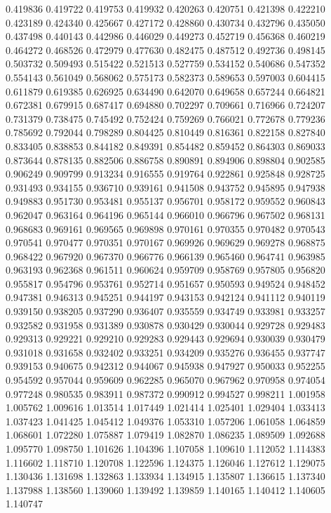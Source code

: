 0.419836
0.419722
0.419753
0.419932
0.420263
0.420751
0.421398
0.422210
0.423189
0.424340
0.425667
0.427172
0.428860
0.430734
0.432796
0.435050
0.437498
0.440143
0.442986
0.446029
0.449273
0.452719
0.456368
0.460219
0.464272
0.468526
0.472979
0.477630
0.482475
0.487512
0.492736
0.498145
0.503732
0.509493
0.515422
0.521513
0.527759
0.534152
0.540686
0.547352
0.554143
0.561049
0.568062
0.575173
0.582373
0.589653
0.597003
0.604415
0.611879
0.619385
0.626925
0.634490
0.642070
0.649658
0.657244
0.664821
0.672381
0.679915
0.687417
0.694880
0.702297
0.709661
0.716966
0.724207
0.731379
0.738475
0.745492
0.752424
0.759269
0.766021
0.772678
0.779236
0.785692
0.792044
0.798289
0.804425
0.810449
0.816361
0.822158
0.827840
0.833405
0.838853
0.844182
0.849391
0.854482
0.859452
0.864303
0.869033
0.873644
0.878135
0.882506
0.886758
0.890891
0.894906
0.898804
0.902585
0.906249
0.909799
0.913234
0.916555
0.919764
0.922861
0.925848
0.928725
0.931493
0.934155
0.936710
0.939161
0.941508
0.943752
0.945895
0.947938
0.949883
0.951730
0.953481
0.955137
0.956701
0.958172
0.959552
0.960843
0.962047
0.963164
0.964196
0.965144
0.966010
0.966796
0.967502
0.968131
0.968683
0.969161
0.969565
0.969898
0.970161
0.970355
0.970482
0.970543
0.970541
0.970477
0.970351
0.970167
0.969926
0.969629
0.969278
0.968875
0.968422
0.967920
0.967370
0.966776
0.966139
0.965460
0.964741
0.963985
0.963193
0.962368
0.961511
0.960624
0.959709
0.958769
0.957805
0.956820
0.955817
0.954796
0.953761
0.952714
0.951657
0.950593
0.949524
0.948452
0.947381
0.946313
0.945251
0.944197
0.943153
0.942124
0.941112
0.940119
0.939150
0.938205
0.937290
0.936407
0.935559
0.934749
0.933981
0.933257
0.932582
0.931958
0.931389
0.930878
0.930429
0.930044
0.929728
0.929483
0.929313
0.929221
0.929210
0.929283
0.929443
0.929694
0.930039
0.930479
0.931018
0.931658
0.932402
0.933251
0.934209
0.935276
0.936455
0.937747
0.939153
0.940675
0.942312
0.944067
0.945938
0.947927
0.950033
0.952255
0.954592
0.957044
0.959609
0.962285
0.965070
0.967962
0.970958
0.974054
0.977248
0.980535
0.983911
0.987372
0.990912
0.994527
0.998211
1.001958
1.005762
1.009616
1.013514
1.017449
1.021414
1.025401
1.029404
1.033413
1.037423
1.041425
1.045412
1.049376
1.053310
1.057206
1.061058
1.064859
1.068601
1.072280
1.075887
1.079419
1.082870
1.086235
1.089509
1.092688
1.095770
1.098750
1.101626
1.104396
1.107058
1.109610
1.112052
1.114383
1.116602
1.118710
1.120708
1.122596
1.124375
1.126046
1.127612
1.129075
1.130436
1.131698
1.132863
1.133934
1.134915
1.135807
1.136615
1.137340
1.137988
1.138560
1.139060
1.139492
1.139859
1.140165
1.140412
1.140605
1.140747

